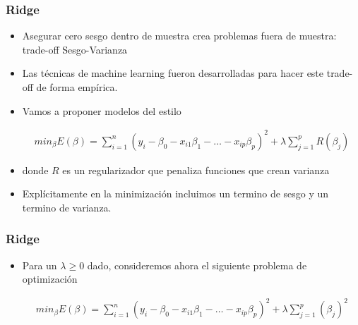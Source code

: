 \documentclass[
  shownotes,
  xcolor={svgnames},
  hyperref={colorlinks,citecolor=DarkBlue,linkcolor=andesred,urlcolor=DarkBlue}
  , aspectratio=169]{beamer}
\begin{document}
\begin{frame}[fragile]
\frametitle{Ridge}
  \begin{itemize}
    \item Asegurar cero sesgo dentro de muestra crea problemas fuera de muestra: trade-off Sesgo-Varianza
    \medskip
    \item Las técnicas de machine learning fueron desarrolladas para hacer este trade-off de forma empírica.
    \medskip
    \item Vamos a proponer modelos del estilo


\begin{align}
min_{\beta} E(\beta) = \sum_{i=1}^n (y_i-\beta_0 - x_{i1}\beta_1 - \dots - x_{ip}\beta_p)^2 + \lambda \sum_{j=1}^p R(\beta_j)
\end{align}

\item donde $R$ es un regularizador que penaliza funciones que crean varianza
\medskip
\item Explícitamente en la minimización incluimos un termino de sesgo y un termino de varianza.


  \end{itemize}
\end{frame}
\begin{frame}[fragile]
\frametitle{Ridge}

\begin{itemize}
\item Para un $\lambda \geq 0$ dado, consideremos ahora el siguiente problema de optimización


\begin{align}
min_{\beta} E(\beta) = \sum_{i=1}^n (y_i-\beta_0 - x_{i1}\beta_1 - \dots - x_{ip}\beta_p)^2 + \lambda \sum_{j=1}^p (\beta_j)^2
\end{align}



\end{itemize}


\end{frame}
\end{document}
